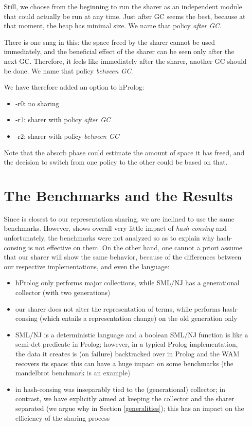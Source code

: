 \documentclass{tlp}
\begin{document}
Still, we choose from the beginning to run the sharer as an
independent module that could actually be run at any time. Just after
GC seems the best, because at that moment, the heap has minimal
size. We name that policy {\em after GC}.

There is one snag in this: the space freed by the sharer cannot be
used immediately, and the beneficial effect of the sharer can be seen
only after the next GC. Therefore, it feels like immediately after
the sharer, another GC should be done. We name that policy {\em
between GC}.

We have therefore added an option to hProlog:
\begin{itemize}
\item 
-r0: no sharing
\item 
-r1: sharer with policy {\em after GC}
\item 
-r2: sharer with policy {\em between GC}
\end{itemize}


Note that the absorb phase could estimate the amount of space it has
freed, and the decision to switch from one policy to the other could
be based on that.



\section{The Benchmarks and the Results}\label{sharerbenchmarks}

Since \cite{appelhashconsinggc} is closest to our representation
sharing, we are inclined to use the same benchmarks. However,
\cite{appelhashconsinggc} shows overall very little impact of {\em
hash-consing} and unfortunately, the benchmarks were not analyzed so
as to explain why hash-consing is not effective on them. On the other
hand, one cannot a priori assume that our sharer will show the same
behavior, because of the differences between our respective
implementations, and even the language:

\begin{itemize}
\item 
hProlog only performs major collections, while SML/NJ has a
generational collector (with two generations)
\item 
our sharer does not alter the representation of terms, while
\cite{appelhashconsinggc} performs hash-consing (which entails a
representation change) on the old generation only
\item 
SML/NJ is a deterministic language and a boolean SML/NJ function is like
a semi-det predicate in Prolog; however, in a typical Prolog
implementation, the data it creates is (on failure) backtracked over
in Prolog and the WAM recovers its space: this can have a huge impact
on some benchmarks (the mandelbrot benchmark is an example)
\item
in \cite{appelhashconsinggc} hash-consing was inseparably tied to the
(generational) collector; in contrast, we have explicitly aimed at
keeping the collector and the sharer separated (we argue why in
Section \ref{generalities}); this has an impact on the efficiency of
the sharing process
\end{itemize}
\end{document}
